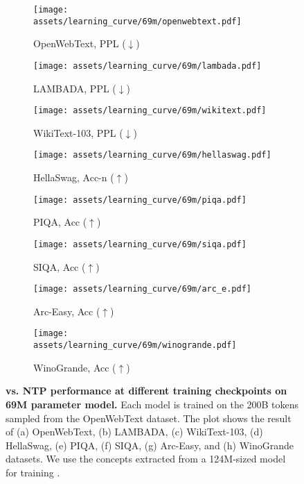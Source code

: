 \begin{figure*}[t]
\centering\small
\vspace{0.1in}
\begin{subfigure}{0.245\textwidth}
    \texttt{[image: assets/learning\_curve/69m/openwebtext.pdf]}
    \caption{OpenWebText, PPL ($\downarrow$)}
\end{subfigure}
\begin{subfigure}{0.245\textwidth}
    \texttt{[image: assets/learning\_curve/69m/lambada.pdf]}
    \caption{LAMBADA, PPL ($\downarrow$)}
\end{subfigure}
\begin{subfigure}{0.245\textwidth}
    \texttt{[image: assets/learning\_curve/69m/wikitext.pdf]}
    \caption{WikiText-103, PPL ($\downarrow$)}
\end{subfigure}
\begin{subfigure}{0.245\textwidth}
    \texttt{[image: assets/learning\_curve/69m/hellaswag.pdf]}
    \caption{HellaSwag, Acc-n ($\uparrow$)}
\end{subfigure}
\begin{subfigure}{0.245\textwidth}
    \texttt{[image: assets/learning\_curve/69m/piqa.pdf]}
    \caption{PIQA, Acc ($\uparrow$)}
\end{subfigure}
\begin{subfigure}{0.245\textwidth}
    \texttt{[image: assets/learning\_curve/69m/siqa.pdf]}
    \caption{SIQA, Acc ($\uparrow$)}
\end{subfigure}
\begin{subfigure}{0.245\textwidth}
    \texttt{[image: assets/learning\_curve/69m/arc\_e.pdf]}
    \caption{Arc-Easy, Acc ($\uparrow$)}
\end{subfigure}
\begin{subfigure}{0.245\textwidth}
    \texttt{[image: assets/learning\_curve/69m/winogrande.pdf]}
    \caption{WinoGrande, Acc ($\uparrow$)}
\end{subfigure}
\caption{
\textbf{\sname vs. NTP performance at different training checkpoints on 69M parameter model.} Each model is trained on the 200B tokens sampled from the OpenWebText dataset. The plot shows the result of (a) OpenWebText, (b) LAMBADA, (c) WikiText-103, (d) HellaSwag, (e) PIQA, (f) SIQA, (g) Arc-Easy, and (h) WinoGrande datasets. We use the concepts extracted from a 124M-sized model for training \sname.
}
\label{fig:downstream_curve_69m}
\end{figure*}
